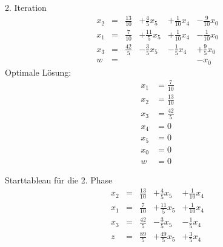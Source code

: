 \documentclass[a4paper]{scrartcl}
\begin{document}
\begin{enumerate}
\begin{enumerate}
                2. Iteration
                \begin{equation}
                    \begin{array}{rcrrrr}
                        x_2 & = & \frac{13}{10} & +\frac{4}{5}x_5 & +\frac{1}{10}x_4 & -\frac{9}{10}x_0 \\
                        x_1 & = & \frac{7}{10} & +\frac{11}{5}x_5 & +\frac{1}{10}x_4 & -\frac{1}{10}x_0 \\
                        x_3 & = & \frac{42}{5} & -\frac{3}{5}x_5 & -\frac{1}{5}x_4 & +\frac{9}{5}x_0 \\
                        \hline
                        w   & = &  &  &  & -x_0 
                    \end{array}
                \end{equation}
                Optimale Lösung:
                \begin{equation}
                    \begin{split}
                        x_1 &= \frac{7}{10} \\
                        x_2 &= \frac{13}{10} \\
                        x_3 &= \frac{42}{5} \\
                        x_4 &= 0 \\
                        x_5 &= 0 \\
                        x_0 &= 0 \\
                        w   &= 0
                    \end{split}
                \end{equation}

                Starttableau für die 2. Phase
                \begin{equation}
                    \begin{array}{rcrrrr}
                        x_2 & = & \frac{13}{10} & +\frac{4}{5}x_5 & +\frac{1}{10}x_4 \\
                        x_1 & = & \frac{7}{10} & +\frac{11}{5}x_5 & +\frac{1}{10}x_4 \\
                        x_3 & = & \frac{42}{5} & -\frac{3}{5}x_5 & -\frac{1}{5}x_4 \\
                        \hline
                        z   & = & \frac{89}{5} & +\frac{49}{5}x_5 & +\frac{3}{5}x_4
                    \end{array}
                \end{equation}


\end{enumerate}
\end{enumerate}
\end{document}
